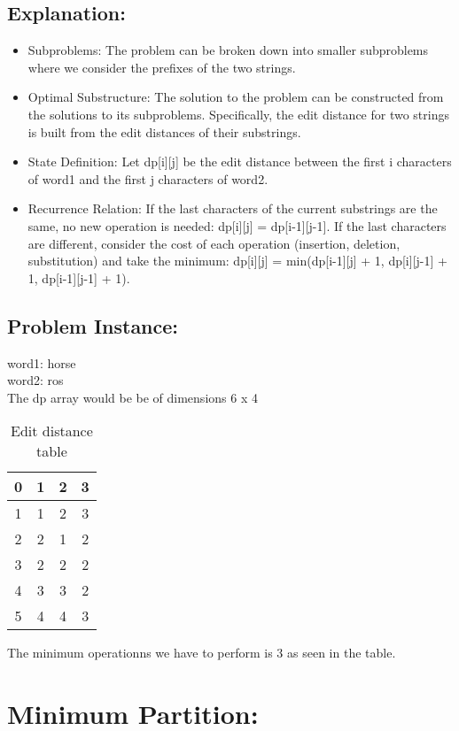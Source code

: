 \documentclass[10pt]{article}
\begin{document}
\subsection{Explanation:}
\begin{itemize}
    \item Subproblems: The problem can be broken down into smaller subproblems where we consider the prefixes of the two strings.
    \item Optimal Substructure: The solution to the problem can be constructed from the solutions to its subproblems. Specifically, the edit distance for two strings is built from the edit distances of their substrings.
    \item State Definition: Let dp[i][j] be the edit distance between the first i characters of word1 and the first j characters of word2.
    \item Recurrence Relation:
    If the last characters of the current substrings are the same, no new operation is needed: dp[i][j] = dp[i-1][j-1].
    If the last characters are different, consider the cost of each operation (insertion, deletion, substitution) and take the minimum: dp[i][j] = min(dp[i-1][j] + 1, dp[i][j-1] + 1, dp[i-1][j-1] + 1).
    
\end{itemize}
\subsection{Problem Instance: }
word1: horse \\
word2: ros \\
The dp array would be be of dimensions 6 x 4\\
\begin{table}[h]
\centering
\begin{tabular}{|c|c|c|c|}
\hline
0 & 1 & 2 & 3 \\ \hline
1 & 1 & 2 & 3 \\ \hline
2 & 2 & 1 & 2 \\ \hline
3 & 2 & 2 & 2 \\ \hline
4 & 3 & 3 & 2 \\ \hline
5 & 4 & 4 & 3 \\ \hline
\end{tabular}
\caption{Edit distance table}\label{tab:edit_distance}
\end{table}
The minimum operationns we have to perform is 3 as seen in the table.
\section{Minimum Partition: }
\end{document}
